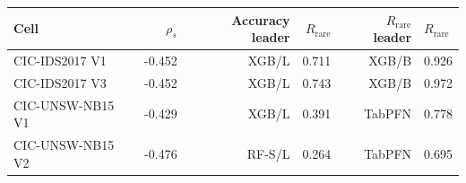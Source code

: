 \begin{tabular}{@{}lrrrrl@{}}
\toprule
Cell & $\rho_s$ & Accuracy leader & $R_{\mathrm{rare}}$ & $R_{\mathrm{rare}}$ leader & $R_{\mathrm{rare}}$ \\
\midrule
CIC-IDS2017 V1 & -0.452 & XGB/L & 0.711 & XGB/B & 0.926 \\
CIC-IDS2017 V3 & -0.452 & XGB/L & 0.743 & XGB/B & 0.972 \\
CIC-UNSW-NB15 V1 & -0.429 & XGB/L & 0.391 & TabPFN & 0.778 \\
CIC-UNSW-NB15 V2 & -0.476 & RF-S/L & 0.264 & TabPFN & 0.695 \\
\bottomrule
\end{tabular}